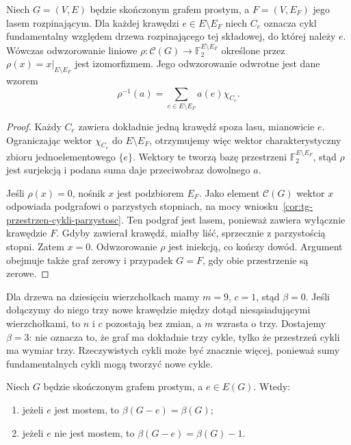 \begin{wniosek}
\label{cor:tg-wspolrzedne-cykli-las}
Niech $G=(V,E)$ będzie skończonym grafem prostym,
a $F=(V,E_F)$ jego lasem rozpinającym.
Dla każdej krawędzi $e\in E\setminus E_F$ niech $C_e$
oznacza cykl fundamentalny względem drzewa rozpinającego
tej składowej, do której należy $e$.
Wówczas odwzorowanie liniowe
$\rho:\mathcal C(G)\to\mathbb F_2^{E\setminus E_F}$
określone przez $\rho(x)=x|_{E\setminus E_F}$
jest izomorfizmem. Jego odwzorowanie odwrotne jest dane
wzorem
\[
\rho^{-1}(a)=\sum_{e\in E\setminus E_F}a(e)\chi_{C_e}.
\]
\end{wniosek}

\begin{proof}
Każdy $C_e$ zawiera dokładnie jedną krawędź spoza lasu,
mianowicie $e$. Ograniczając wektor $\chi_{C_e}$
do $E\setminus E_F$, otrzymujemy więc wektor
charakterystyczny zbioru jednoelementowego $\{e\}$.
Wektory te tworzą bazę przestrzeni
$\mathbb F_2^{E\setminus E_F}$, stąd $\rho$ jest surjekcją
i podana suma daje przeciwobraz dowolnego $a$.

Jeśli $\rho(x)=0$, nośnik $x$ jest podzbiorem $E_F$.
Jako element $\mathcal C(G)$ wektor $x$ odpowiada
podgrafowi o parzystych stopniach, na mocy
wniosku~\ref{cor:tg-przestrzen-cykli-parzystosc}.
Ten podgraf jest lasem, ponieważ zawiera wyłącznie
krawędzie $F$. Gdyby zawierał krawędź, miałby liść,
sprzecznie z parzystością stopni. Zatem $x=0$.
Odwzorowanie $\rho$ jest iniekcją, co kończy dowód.
Argument obejmuje także graf zerowy i przypadek $G=F$,
gdy obie przestrzenie są zerowe.
\end{proof}

\begin{przyklad}
Dla drzewa na dziesięciu wierzchołkach mamy
$m=9$, $c=1$, stąd $\beta=0$.
Jeśli dołączymy do niego trzy nowe krawędzie
między dotąd niesąsiadującymi wierzchołkami,
to $n$ i $c$ pozostają bez zmian, a $m$
wzrasta o trzy. Dostajemy $\beta=3$:
nie oznacza to, że graf ma dokładnie trzy
cykle, tylko że przestrzeń cykli ma
wymiar trzy. Rzeczywistych cykli może
być znacznie więcej, ponieważ sumy
fundamentalnych cykli mogą tworzyć
nowe cykle.
\end{przyklad}

\begin{stwierdzenie}
Niech $G$ będzie skończonym grafem prostym,
a $e\in E(G)$. Wtedy:
\begin{enumerate}[label=(\roman*)]
\item jeżeli $e$ jest mostem, to $\beta(G-e)=\beta(G)$;
\item jeżeli $e$ nie jest mostem, to
$\beta(G-e)=\beta(G)-1$.
\end{enumerate}
\end{stwierdzenie}

